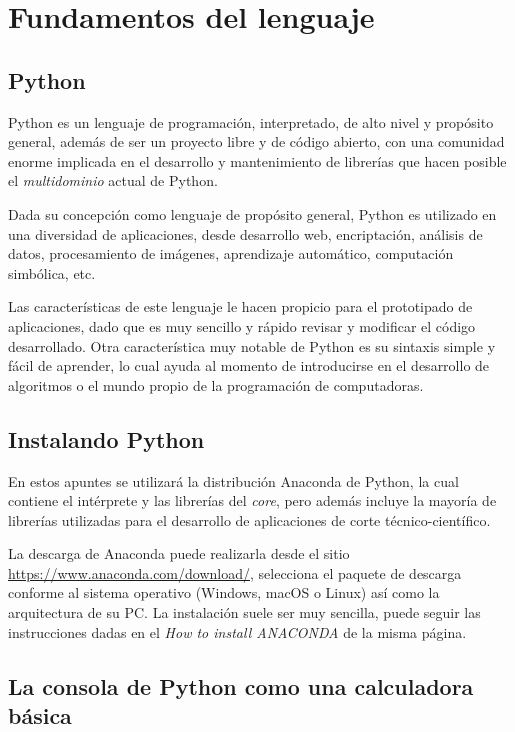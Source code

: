 \chapter{Fundamentos del lenguaje}


\section{Python}

Python es un lenguaje de programación, interpretado, de alto nivel y propósito general, además de ser un proyecto  
libre y de código abierto, con una comunidad enorme implicada en el desarrollo y mantenimiento de librerías que hacen 
posible el \textit{multidominio} actual de Python.

Dada su concepción como lenguaje de propósito general, Python es utilizado en una diversidad de aplicaciones, 
desde desarrollo web, encriptación, análisis de datos, procesamiento de imágenes, aprendizaje automático, 
computación simbólica, etc.  

Las características de este lenguaje le hacen propicio para el prototipado de aplicaciones, dado que es muy 
sencillo y rápido revisar y modificar el código desarrollado. Otra característica muy notable de Python 
es su sintaxis simple y fácil de aprender, lo cual ayuda al momento de introducirse en el desarrollo de 
algoritmos o el mundo propio de la programación de computadoras.

\section{Instalando Python}

En estos apuntes se utilizará la distribución Anaconda de Python, la cual contiene el intérprete y las librerías del 
\textit{core}, pero además incluye la mayoría de librerías utilizadas para el desarrollo de aplicaciones de corte 
técnico-científico.

La descarga de Anaconda puede realizarla desde el sitio \url{https://www.anaconda.com/download/}, selecciona el 
paquete de descarga conforme al sistema operativo (Windows, macOS o Linux) así como la arquitectura de su PC.
La instalación suele ser muy sencilla, puede seguir las instrucciones dadas en el \textit{How to install ANACONDA} de 
la misma página.

\section{La consola de Python como una calculadora básica}

